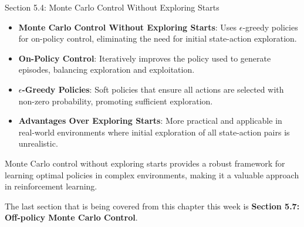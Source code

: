 \begin{notes}{Section 5.4: Monte Carlo Control Without Exploring Starts}
\begin{highlight}
    \end{highlight}
    
    \begin{highlight}
    
        \begin{itemize}
            \item \textbf{Monte Carlo Control Without Exploring Starts}: Uses $\epsilon$-greedy policies for on-policy control, eliminating the need for initial state-action exploration.
            \item \textbf{On-Policy Control}: Iteratively improves the policy used to generate episodes, balancing exploration and exploitation.
            \item \textbf{$\epsilon$-Greedy Policies}: Soft policies that ensure all actions are selected with non-zero probability, promoting sufficient exploration.
            \item \textbf{Advantages Over Exploring Starts}: More practical and applicable in real-world environments where initial exploration of all state-action pairs is unrealistic.
        \end{itemize}
    
        Monte Carlo control without exploring starts provides a robust framework for learning optimal policies in complex environments, making it a valuable approach in reinforcement learning.
    
    \end{highlight}
\end{notes}

The last section that is being covered from this chapter this week is \textbf{Section 5.7: Off-policy Monte Carlo Control}.

